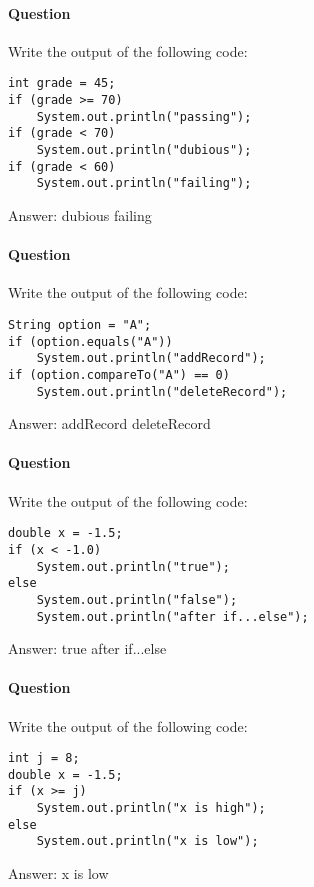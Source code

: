 \documentclass{article}
\begin{document}
\addtocounter{question_num}{1}
\paragraph{Question }
Write the output of the following code:
\begin{lstlisting}
int grade = 45;
if (grade >= 70)
	System.out.println("passing");
if (grade < 70)
	System.out.println("dubious");
if (grade < 60)
	System.out.println("failing");
\end{lstlisting}
{\color{red}Answer:
\newline dubious
\newline failing
}

\addtocounter{question_num}{1}
\paragraph{Question }
Write the output of the following code:
\begin{lstlisting}
String option = "A";
if (option.equals("A"))
	System.out.println("addRecord");
if (option.compareTo("A") == 0)
	System.out.println("deleteRecord");
\end{lstlisting}
{\color{red}Answer:
\newline addRecord
\newline deleteRecord
}

\addtocounter{question_num}{1}
\paragraph{Question }
Write the output of the following code:
\begin{lstlisting}
double x = -1.5;
if (x < -1.0)
	System.out.println("true");
else
	System.out.println("false");
	System.out.println("after if...else");
\end{lstlisting}
{\color{red}Answer:
\newline true
\newline after if...else
}

\addtocounter{question_num}{1}
\paragraph{Question }
Write the output of the following code:
\begin{lstlisting}
int j = 8;
double x = -1.5;
if (x >= j)
	System.out.println("x is high");
else
	System.out.println("x is low");
\end{lstlisting}
{\color{red}Answer:
\newline x is low
}
\end{document}
